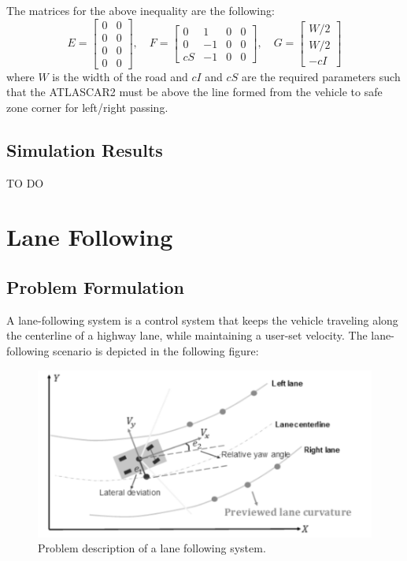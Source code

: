 \documentclass[conference, 11pt]{IEEEtran}
\begin{document}
The matrices for the above inequality are the following:
\[
E= 
\begin{bmatrix}
0&0\\
0&0\\
0&0\\
0&0
\end{bmatrix},
\quad
F=\begin{bmatrix}
0&1&0&0\\
0&-1&0&0\\
cS&-1&0&0
\end{bmatrix},\quad
G=
\begin{bmatrix}
W/2\\W/2\\-cI
\end{bmatrix}
\]
where $W$ is the width of the road and $cI$ and $cS$ are the required parameters such that the ATLASCAR2 must be above the line formed from the vehicle to safe zone corner for left/right passing.

\subsection{Simulation Results}
TO DO




















\section{Lane Following}
\subsection{Problem Formulation}
A lane-following system is a control system that keeps the vehicle traveling along the centerline of a highway lane, while maintaining a user-set velocity. The lane-following scenario is depicted in the following figure:
\begin{figure}[!h]
	\centering
	\includegraphics[width=1\columnwidth]{./figure/laneFollowing.pdf}
	\caption{Problem description of a lane following system.}
	\label{fig:laneFollowing}
\end{figure}
\end{document}
